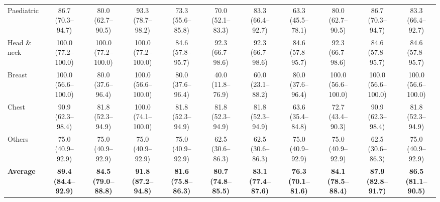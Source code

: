 \documentclass[10pt,journal,compsoc, onecolumn]{IEEEtran}
\begin{document}
\begin{table}[!htbp]
{\begin{tabular}{l ccc @{\hskip 4pt} c @{\hskip 4pt} cc @{\hskip 4pt} ccc @{\hskip 4pt} c}
Paediatric             & 86.7 (70.3--94.7) & 80.0 (62.7--90.5) & 93.3 (78.7--98.2) & 73.3 (55.6--85.8) & 70.0 (52.1--83.3) & 83.3 (66.4--92.7) & 63.3 (45.5--78.1) & 80.0 (62.7--90.5) & 86.7 (70.3--94.7) & 83.3 (66.4--92.7) \\
Head \& neck           & 100.0 (77.2--100.0) & 100.0 (77.2--100.0) & 100.0 (77.2--100.0) & 84.6 (57.8--95.7) & 92.3 (66.7--98.6) & 92.3 (66.7--98.6) & 84.6 (57.8--95.7) & 92.3 (66.7--98.6) & 84.6 (57.8--95.7) & 84.6 (57.8--95.7) \\
Breast                 & 100.0 (56.6--100.0) & 80.0 (37.6--96.4) & 100.0 (56.6--100.0) & 80.0 (37.6--96.4) & 40.0 (11.8--76.9) & 60.0 (23.1--88.2) & 80.0 (37.6--96.4) & 100.0 (56.6--100.0) & 100.0 (56.6--100.0) & 100.0 (56.6--100.0) \\
Chest                  & 90.9 (62.3--98.4) & 81.8 (52.3--94.9) & 100.0 (74.1--100.0) & 81.8 (52.3--94.9) & 81.8 (52.3--94.9) & 81.8 (52.3--94.9) & 63.6 (35.4--84.8) & 72.7 (43.4--90.3) & 90.9 (62.3--98.4) & 81.8 (52.3--94.9) \\
Others                 & 75.0 (40.9--92.9) & 75.0 (40.9--92.9) & 75.0 (40.9--92.9) & 75.0 (40.9--92.9) & 62.5 (30.6--86.3) & 62.5 (30.6--86.3) & 75.0 (40.9--92.9) & 75.0 (40.9--92.9) & 62.5 (30.6--86.3) & 75.0 (40.9--92.9) \\
\midrule
\textbf{Average}       & \textbf{89.4 (84.4--92.9)} & \textbf{84.5 (79.0--88.8)} & \textbf{91.8 (87.2--94.8)} & \textbf{81.6 (75.8--86.3)} & \textbf{80.7 (74.8--85.5)} & \textbf{83.1 (77.4--87.6)} & \textbf{76.3 (70.1--81.6)} & \textbf{84.1 (78.5--88.4)} & \textbf{87.9 (82.8--91.7)} & \textbf{86.5 (81.1--90.5)} \\
\bottomrule
\end{tabular}%
}
\end{table}
\end{document}

